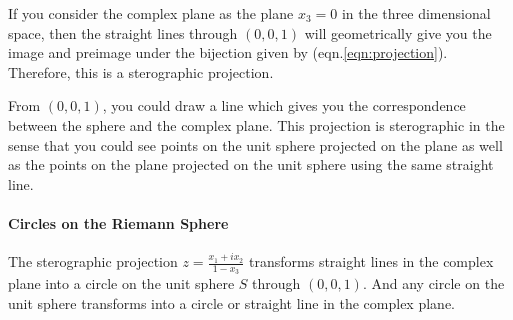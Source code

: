 If you consider the complex plane as the plane $x_3 = 0$ in the three dimensional space, then the straight lines through $(0,0,1)$ will geometrically give you the image and preimage under the bijection given by (eqn.\ref{eqn:projection}).
Therefore, this is a sterographic projection.\\

\begin{commentary}
	From $(0,0,1)$, you could draw a line which gives you the correspondence between the sphere and the complex plane.
	This projection is sterographic in the sense that you could see points on the unit sphere projected on the plane as well as the points on the plane projected on the unit sphere using the same straight line.
\end{commentary}

\paragraph{Circles on the Riemann Sphere}
\begin{remark}
	The sterographic projection $z = \frac{x_1+ix_2}{1-x_3}$ transforms straight lines in the complex plane into a circle on the unit sphere $S$ through $(0,0,1)$.
	And any circle on the unit sphere transforms into a circle or straight line in the complex plane.
\end{remark}
